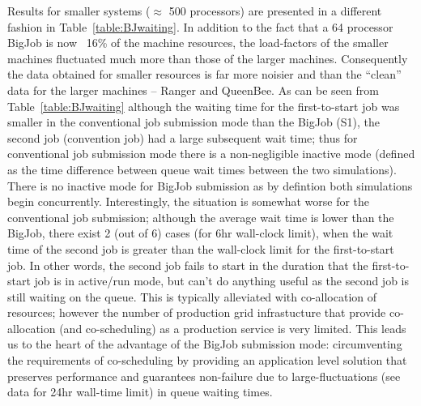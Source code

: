 \documentclass[conference,final]{IEEEtran}
\begin{document}
Results for smaller systems ($\approx$ 500 processors) are presented
in a different fashion in Table~\ref{table:BJwaiting}. In addition to
the fact that a 64 processor BigJob is now ~16\% of the machine
resources, the load-factors of the smaller machines fluctuated much
more than those of the larger machines. Consequently the data obtained
for smaller resources is far more noisier and than the ``clean'' data
for the larger machines -- Ranger and QueenBee. As can be seen from
Table~\ref{table:BJwaiting} although the waiting time for the
first-to-start job was smaller in the conventional job submission mode
than the BigJob (S1), the second job (convention job) had a large
subsequent wait time; thus for conventional job submission mode there
is a non-negligible inactive mode (defined as the time difference
between queue wait times between the two simulations). There is no
inactive mode for BigJob submission as by defintion both simulations
begin concurrently. Interestingly, the situation is somewhat worse for
the conventional job submission; although the average wait time is
lower than the BigJob, there exist 2 (out of 6) cases (for 6hr
wall-clock limit), when the wait time of the second job is greater
than the wall-clock limit for the first-to-start job. In other words,
the second job fails to start in the duration that the first-to-start
job is in active/run mode, but can't do anything useful as the second
job is still waiting on the queue. This is typically alleviated with
co-allocation of resources; however the number of production grid
infrastucture that provide co-allocation (and co-scheduling) as a
production service is very limited. This leads us to the heart of the
advantage of the BigJob submission mode: circumventing the
requirements of co-scheduling by providing an application level
solution that preserves performance and guarantees non-failure due to
large-fluctuations (see data for 24hr wall-time limit) in queue
waiting times.



\end{document}
